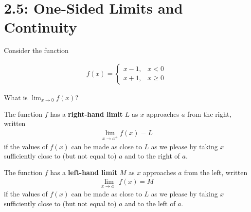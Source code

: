 \documentclass[../mathNotesPreamble]{subfiles}
\providecommand{\relscalefact}{1.4}
\begin{document}
\relscale{\relscalefact}
  \section{2.5: One-Sided Limits and Continuity}
  Consider the function

  \noindent
  \begin{minipage}{0.5\linewidth}
    \begin{align*}
      f(x)=\begin{cases}
        x-1,& x<0\\
        x+1,& x\geq 0
      \end{cases}
    \end{align*}
  \end{minipage}\hfill%
  \begin{minipage}{0.45\linewidth}
    \begin{flushright}
    \end{flushright}
  \end{minipage}
  \vspace*{\baselineskip}

  \noindent What is $\displaystyle\lim_{x\to 0} f(x)$?
  \begin{defn*}
    The function $f$ has a \textbf{right-hand limit} $L$ as $x$ approaches $a$ from the right, written
    \begin{align*}
      \lim_{x\to a^+} f(x)=L
    \end{align*}
    if the values of $f(x)$ can be made as close to $L$ as we please by taking $x$ sufficiently close to (but not equal to) $a$ and to the right of $a$.

    The function $f$ has a \textbf{left-hand limit} $M$ as $x$ approaches $a$ from the left, written
    \begin{align*}
      \lim_{x\to a^-} f(x)=M
    \end{align*}
    if the values of $f(x)$ can be made as close to $L$ as we please by taking $x$ sufficiently close to (but not equal to) $a$ and to the left of $a$.
  \end{defn*}
  \pagebreak
\end{document}
